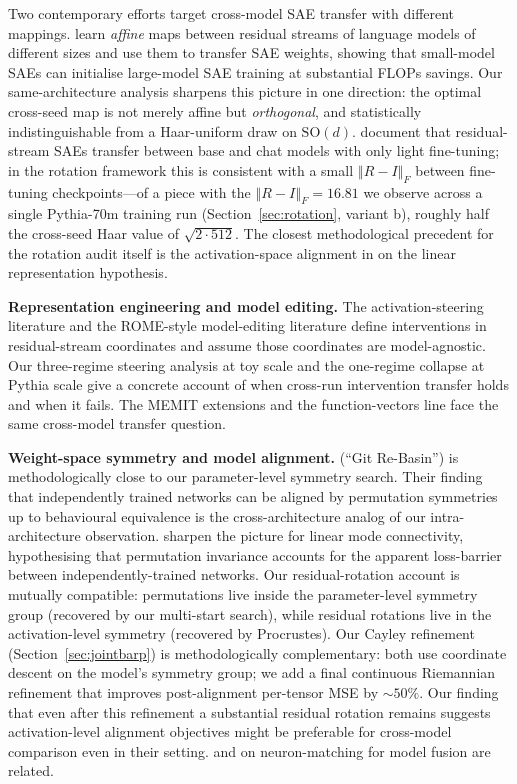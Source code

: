 \documentclass[11pt,letterpaper]{article}
\newcommand{\R}{R}
\newcommand{\frobnorm}[1]{\left\Vert #1 \right\Vert_F}
\begin{document}
Two contemporary efforts target cross-model SAE transfer with different mappings. \citet{chen2025stitching} learn \emph{affine} maps between residual streams of language models of different sizes and use them to transfer SAE weights, showing that small-model SAEs can initialise large-model SAE training at substantial FLOPs savings. Our same-architecture analysis sharpens this picture in one direction: the optimal cross-seed map is not merely affine but \emph{orthogonal}, and statistically indistinguishable from a Haar-uniform draw on $\mathrm{SO}(d)$. \citet{kissane2024transfer} document that residual-stream SAEs transfer between base and chat models with only light fine-tuning; in the rotation framework this is consistent with a small $\frobnorm{\R - I}$ between fine-tuning checkpoints---of a piece with the $\frobnorm{\R - I} = 16.81$ we observe across a single Pythia-70m training run (Section~\ref{sec:rotation}, variant b), roughly half the cross-seed Haar value of $\sqrt{2 \cdot 512}$. The closest methodological precedent for the rotation audit itself is the activation-space alignment in \citet{park2024linear} on the linear representation hypothesis.

\textbf{Representation engineering and model editing.} The activation-steering literature \citep{turner2023activation,zou2023representation} and the ROME-style model-editing literature \citep{meng2022rome,meng2023memit} define interventions in residual-stream coordinates and assume those coordinates are model-agnostic. Our three-regime steering analysis at toy scale and the one-regime collapse at Pythia scale give a concrete account of when cross-run intervention transfer holds and when it fails. The MEMIT extensions and the function-vectors line \citep{todd2024function} face the same cross-model transfer question.

\textbf{Weight-space symmetry and model alignment.} \citet{ainsworth2023git} (``Git Re-Basin'') is methodologically close to our parameter-level symmetry search. Their finding that independently trained networks can be aligned by permutation symmetries up to behavioural equivalence is the cross-architecture analog of our intra-architecture observation. \citet{entezari2022role} sharpen the picture for linear mode connectivity, hypothesising that permutation invariance accounts for the apparent loss-barrier between independently-trained networks. Our residual-rotation account is mutually compatible: permutations live inside the parameter-level symmetry group (recovered by our multi-start search), while residual rotations live in the activation-level symmetry (recovered by Procrustes). Our Cayley refinement (Section~\ref{sec:jointbarp}) is methodologically complementary: both use coordinate descent on the model's symmetry group; we add a final continuous Riemannian refinement that improves post-alignment per-tensor MSE by ${\sim}50\%$. Our finding that even after this refinement a substantial residual rotation remains suggests activation-level alignment objectives might be preferable for cross-model comparison even in their setting. \citet{tatro2020optimizing} and \citet{singh2020fusion} on neuron-matching for model fusion are related.
\end{document}
